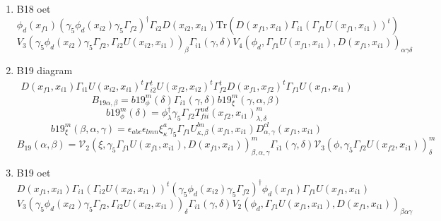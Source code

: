 \documentclass{article}[12pt]
\begin{document}
\begin{itemize}
\begin{enumerate}
$$
B_{18}\left(\alpha,\beta\right)={\mathcal V}_{3}\left(\phi,\gamma_5\Gamma_{f2},T_{fii}^{uu}\right)^{n}_{\beta}\Gamma_{i1}\left(\gamma,\delta\right){\mathcal V}_{4}\left(\xi,\gamma_5\Gamma_{f1}U,D\right)^{n}_{\alpha,\delta,\gamma}
$$
\item B18 oet
$$
\phi_d(x_{f1})(\gamma_5\phi_d(x_{i2})\gamma_5\Gamma_{f2})^{\dagger}\Gamma_{i2}D(x_{i2},x_{i1})\mathrm{Tr}(D(x_{f1},x_{i1})\Gamma_{i1}(\Gamma_{f1}U(x_{f1},x_{i1}))^t)
$$
$$
V_3(\gamma_5\phi_d(x_{i2})\gamma_5\Gamma_{f2},\Gamma_{i2}U(x_{i2},x_{i1}))_{\beta}\Gamma_{i1}(\gamma,\delta)V_4(\phi_d,\Gamma_{f1}U(x_{f1},x_{i1}),D(x_{f1},x_{i1}))_{\alpha\gamma\delta}
$$
\item B19 diagram
\begin{eqnarray}
D(x_{f1},x_{i1})\Gamma_{i1}U(x_{i2},x_{i1})^t\Gamma_{i2}^tU(x_{f2},x_{i2})^t\Gamma_{f2}^tD(x_{f1},x_{f2})^t\Gamma_{f1}U(x_{f1},x_{i1})
\end{eqnarray}
$$
B_{19\alpha,\beta}=b19_{\phi}^{m}\left(\delta\right)\Gamma_{i1}\left(\gamma,\delta\right)b19_{\xi}^{m}\left(\gamma,\alpha,\beta\right)
$$
$$
b19_{\phi}^{m}\left(\delta\right)=\phi^{\dagger}_{\lambda}\gamma_5\Gamma_{f2}T_{fii}^{ud}\left(x_{f2},x_{i1}\right)^{m}_{\lambda,\delta}
$$
$$
b19_{\xi}^{m}\left(\beta,\alpha,\gamma\right)=\epsilon_{abc}\epsilon_{lmn}\xi^{a}_{\kappa}\gamma_5\Gamma_{f1}U_{\kappa,\beta}^{bn}\left(x_{f1},x_{i1}\right)D^{cl}_{\alpha,\gamma}\left(x_{f1},x_{i1}\right)
$$
$$
B_{19}\left(\alpha,\beta\right)={\mathcal V}_2\left(\xi,\gamma_5\Gamma_{f1}U\left(x_{f1},x_{i1}\right),D\left(x_{f1},x_{i1}\right)\right)^{m}_{\beta,\alpha,\gamma}\Gamma_{i1}\left(\gamma,\delta\right){\mathcal V}_3\left(\phi,\gamma_5\Gamma_{f2}U\left(x_{f2},x_{i1}\right)\right)^{m}_{\delta}
$$
\item B19 oet
$$
D(x_{f1},x_{i1})\Gamma_{i1}(\Gamma_{i2}U(x_{i2},x_{i1}))^t(\gamma_5\phi_d(x_{i2})\gamma_5\Gamma_{f2})^{\dagger}\phi_d(x_{f1})\Gamma_{f1}U(x_{f1},x_{i1})
$$
$$
V_3(\gamma_5\phi_d(x_{i2})\gamma_5\Gamma_{f2},\Gamma_{i2}U(x_{i2},x_{i1}))_{\delta}\Gamma_{i1}(\gamma,\delta)V_2(\phi_d,\Gamma_{f1}U(x_{f1},x_{i1}),D(x_{f1},x_{i1}))_{\beta\alpha\gamma}
$$


\end{enumerate}
\end{itemize}
\end{document}
